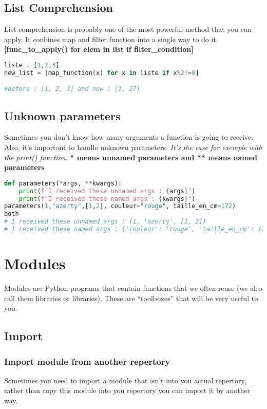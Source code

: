 \documentclass[a4paper, 12pt]{article}
\begin{document}
\subsection{List Comprehension}
List comprehension is probably one of the most powerful method that you can apply. It conbines map and filter function into a single way to do it. \textbf{[func\_to\_apply() for elem in list if filter\_condition]}
\label{subsec:ListComprehension}
\begin{lstlisting}[language=Python]
liste = [1,2,3]
new_list = [map_function(x) for x in liste if x%2!=0]

#before : [1, 2, 3] and now : [1, 27]
\end{lstlisting}

\subsection{Unknown parameters}
Sometimes you don't know how many arguments a function is going to receive. Also, it's important to handle unknown parameters. \textit{It's the case for exemple with the print() function}. \textbf{* means unnamed parameters and ** means named parameters}
\begin{lstlisting}[language=Python]
def parameters(*args, **kwargs):
	print(f"I received these unnamed args : {args}")
	print(f"I received these named args : {kwargs}")
parameters(1,"azerty",[1,2], couleur="rouge", taille_en_cm=172)
both
# I received these unnamed args : (1, 'azerty', [1, 2])
# I received these named args : {'couleur': 'rouge', 'taille_en_cm': 172}
\end{lstlisting}

\newpage
\section{Modules}
Modules are Python programs that contain functions that we often reuse (we also call them libraries or libraries). These are “toolboxes” that will be very useful to you.\newline

\subsection{Import}
\label{subsec:Import}
\subsubsection{Import module from another repertory}
Sometimes you need to import a module that isn't into you actual repertory, rather than copy this module into you repertory you can import it by another way. \\
\end{document}
